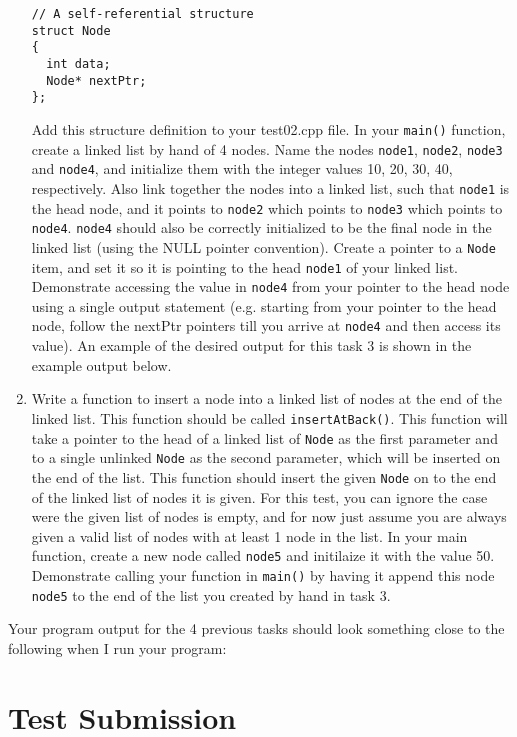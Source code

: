 \documentclass[11pt]{article}
\begin{document}
\begin{enumerate}
\begin{verbatim}
// A self-referential structure
struct Node
{
  int data;
  Node* nextPtr;
};
\end{verbatim}
   Add this structure definition to your test02.cpp file.  In your
   \verb~main()~ function, create a linked list by hand of 4 nodes.  Name
   the nodes \verb~node1~, \verb~node2~, \verb~node3~ and \verb~node4~, and initialize
   them with the integer values 10, 20, 30, 40, respectively.  Also
   link together the nodes into a linked list, such that \verb~node1~ is
   the head node, and it points to \verb~node2~ which points to \verb~node3~
   which points to \verb~node4~.  \verb~node4~ should also be correctly
   initialized to be the final node in the linked list (using the NULL
   pointer convention).  Create a pointer to a \verb~Node~ item, and set it
   so it is pointing to the head \verb~node1~ of your linked list.  Demonstrate
   accessing the value in \verb~node4~ from your pointer to the head node using
   a single output statement (e.g. starting from your pointer to the head
   node, follow the nextPtr pointers till you arrive at \verb~node4~ and then
   access its value).  An example of the desired output for this task
   3 is shown in the example output below.
\item Write a function to insert a node into a linked list of nodes at
   the end of the linked list.  This function should be called
   \verb~insertAtBack()~.  This function will take a pointer to the head of
   a linked list of \verb~Node~ as the first parameter and to a single
   unlinked \verb~Node~ as the second parameter, which will be inserted on
   the end of the list.  This function should insert the given \verb~Node~
   on to the end of the linked list of nodes it is given.  For this
   test, you can ignore the case were the given list of nodes is
   empty, and for now just assume you are always given a valid list of
   nodes with at least 1 node in the list.  In your main function,
   create a new node called \verb~node5~ and initilaize it with the
   value 50.  Demonstrate calling your function in \verb~main()~ by having
   it append this node \verb~node5~ to the end of the list you created by
   hand in task 3.
\end{enumerate}

Your program output for the 4 previous tasks should look something
close to the following when I run your program:
\section*{Test Submission}
\label{sec-3}
\end{document}
